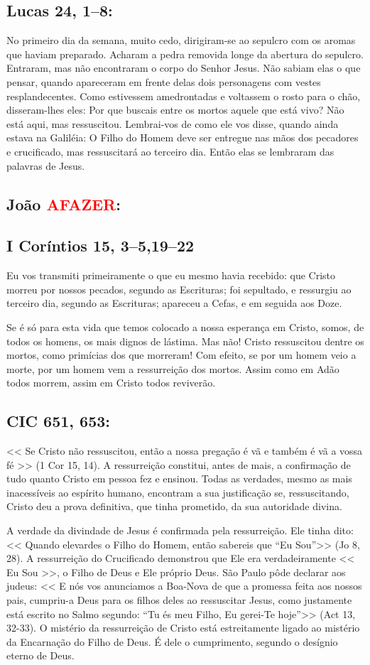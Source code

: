 \documentclass[10pt,a5paper]{book}
\newcommand{\from}[1]{\subsection*{#1}}
\newcommand{\TODO}{\textcolor{red}{\ttfamily AFAZER}}
\begin{document}
\from{Lucas 24, 1--8:}

No primeiro dia da semana, muito cedo, dirigiram-se ao sepulcro com os aromas que haviam preparado.
Acharam a pedra removida longe da abertura do sepulcro.
Entraram, mas não encontraram o corpo do Senhor Jesus.
Não sabiam elas o que pensar, quando apareceram em frente delas dois personagens com vestes resplandecentes.
Como estivessem amedrontadas e voltassem o rosto para o chão, disseram-lhes eles: Por que buscais entre os mortos aquele que está vivo?
Não está aqui, mas ressuscitou. Lembrai-vos de como ele vos disse, quando ainda estava na Galiléia:
O Filho do Homem deve ser entregue nas mãos dos pecadores e crucificado, mas ressuscitará ao terceiro dia.
Então elas se lembraram das palavras de Jesus.

\from{João \TODO:}

\from{I Coríntios 15, 3--5,19--22}

Eu vos transmiti primeiramente o que eu mesmo havia recebido: que Cristo morreu por nossos pecados, segundo as Escrituras;
foi sepultado, e ressurgiu ao terceiro dia, segundo as Escrituras;
apareceu a Cefas, e em seguida aos Doze.

Se é só para esta vida que temos colocado a nossa esperança em Cristo, somos, de todos os homens, os mais dignos de lástima.
Mas não! Cristo ressuscitou dentre os mortos, como primícias dos que morreram!
Com efeito, se por um homem veio a morte, por um homem vem a ressurreição dos mortos.
Assim como em Adão todos morrem, assim em Cristo todos reviverão.

\from{CIC 651, 653:}

<< Se Cristo não ressuscitou, então a nossa pregação é vã e também é vã a vossa fé >> (1 Cor 15, 14).
A ressurreição constitui, antes de mais, a confirmação de tudo quanto Cristo em pessoa fez e ensinou.
Todas as verdades, mesmo as mais inacessíveis ao espírito humano, encontram a sua justificação se, ressuscitando, Cristo deu a prova definitiva, que tinha prometido, da sua autoridade divina.

A verdade da divindade de Jesus é confirmada pela ressurreição.
Ele tinha dito: << Quando elevardes o Filho do Homem, então sabereis que ``Eu Sou''>> (Jo 8, 28).
A ressurreição do Crucificado demonstrou que Ele era verdadeiramente << Eu Sou >>, o Filho de Deus e Ele próprio Deus.
São Paulo pôde declarar aos judeus: << E nós vos anunciamos a Boa-Nova de que a promessa feita aos nossos pais, cumpriu-a Deus para os filhos deles ao ressuscitar Jesus, como justamente está escrito no Salmo segundo: ``Tu és meu Filho, Eu gerei-Te hoje''>> (Act 13, 32-33).
O mistério da ressurreição de Cristo está estreitamente ligado ao mistério da Encarnação do Filho de Deus.
É dele o cumprimento, segundo o desígnio eterno de Deus.
\end{document}
